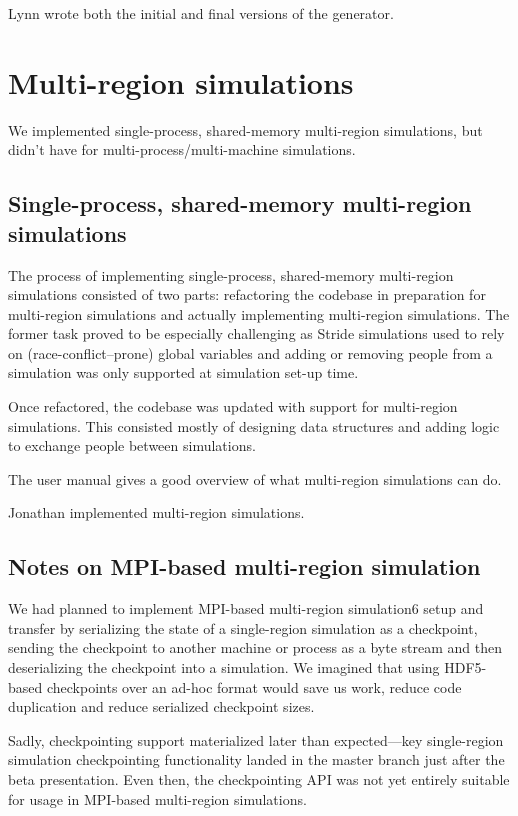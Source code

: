 \documentclass[a4paper,12pt]{article}
\begin{document}
Lynn wrote both the initial and final versions of the generator.

\section{Multi-region simulations}

We implemented single-process, shared-memory multi-region simulations, but didn't have for multi-process/multi-machine simulations.

\subsection{Single-process, shared-memory multi-region simulations}

The process of implementing single-process, shared-memory multi-region simulations consisted of two parts: refactoring the codebase in preparation for multi-region simulations and actually implementing multi-region simulations. The former task proved to be especially challenging as Stride simulations used to rely on (race-conflict--prone) global variables and adding or removing people from a simulation was only supported at simulation set-up time.

Once refactored, the codebase was updated with support for multi-region simulations. This consisted mostly of designing data structures and adding logic to exchange people between simulations.

The user manual gives a good overview of what multi-region simulations can do.

Jonathan implemented multi-region simulations.

\subsection{Notes on MPI-based multi-region simulation}

We had planned to implement MPI-based multi-region simulation6 setup and transfer by serializing the state of a single-region simulation as a checkpoint, sending the checkpoint to another machine or process as a byte stream and then deserializing the checkpoint into a simulation. We imagined that using HDF5-based checkpoints over an ad-hoc format would save us work, reduce code duplication and reduce serialized checkpoint sizes.

Sadly, checkpointing support materialized later than expected---key single-region simulation checkpointing functionality landed in the master branch just after the beta presentation. Even then, the checkpointing API was not yet entirely suitable for usage in MPI-based multi-region simulations.
\end{document}
